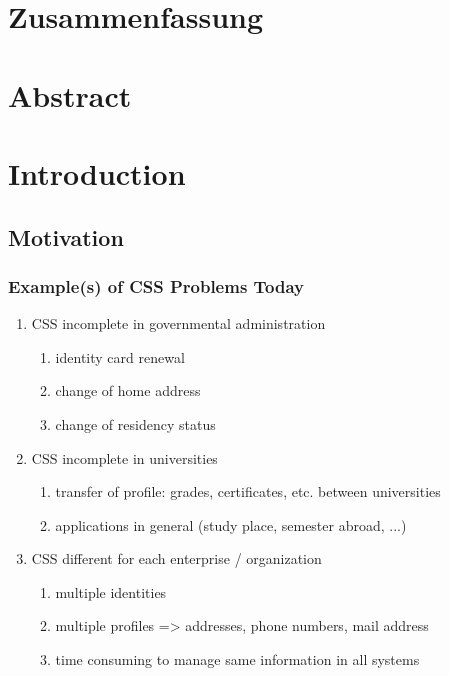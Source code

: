 \documentclass[
     12pt,         %
     a4paper,      %
     BCOR10mm,     %
     DIV14,        %
     ]{scrreprt}
\begin{document}
\chapter*{Zusammenfassung}

\newpage

\chapter*{Abstract}

\newpage

\tableofcontents
\cleardoublepage
{}



\chapter{Introduction}\label{intro}

\section{Motivation}

\subsection{Example(s) of CSS Problems Today}
\begin{enumerate}
     \item CSS incomplete in governmental administration
           \begin{enumerate}
                \item identity card renewal
                \item change of home address
                \item change of residency status
           \end{enumerate}

     \item CSS incomplete in universities
           \begin{enumerate}
                \item transfer of profile: grades, certificates, etc. between universities
                \item applications in general (study place, semester abroad, ...)
           \end{enumerate}

     \item CSS different for each enterprise / organization
           \begin{enumerate}
                \item multiple identities
                \item multiple profiles => addresses, phone numbers, mail address
                \item time consuming to manage same information in all systems
           \end{enumerate}
\end{enumerate}
\end{document}
